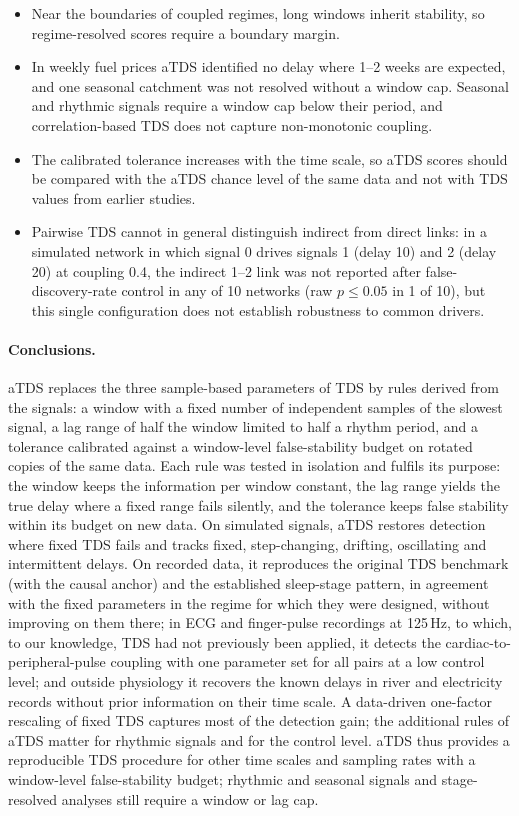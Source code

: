 \documentclass[11pt,a4paper]{article}
\begin{document}
\begin{itemize}
\item Near the boundaries of coupled regimes, long windows inherit stability, so regime-resolved scores require a boundary margin.
\item In weekly fuel prices aTDS identified no delay where 1--2 weeks are expected, and one seasonal catchment was not resolved without a window cap. Seasonal and rhythmic signals require a window cap below their period, and correlation-based TDS does not capture non-monotonic coupling.
\item The calibrated tolerance increases with the time scale, so aTDS scores should be compared with the aTDS chance level of the same data and not with TDS values from earlier studies.
\item Pairwise TDS cannot in general distinguish indirect from direct links: in a simulated network in which signal 0 drives signals 1 (delay 10) and 2 (delay 20) at coupling 0.4, the indirect 1--2 link was not reported after false-discovery-rate control in any of 10 networks (raw $p \le 0.05$ in 1 of 10), but this single configuration does not establish robustness to common drivers.
\end{itemize}

\paragraph{Conclusions.} aTDS replaces the three sample-based parameters of TDS by rules derived from the signals: a window with a fixed number of independent samples of the slowest signal, a lag range of half the window limited to half a rhythm period, and a tolerance calibrated against a window-level false-stability budget on rotated copies of the same data. Each rule was tested in isolation and fulfils its purpose: the window keeps the information per window constant, the lag range yields the true delay where a fixed range fails silently, and the tolerance keeps false stability within its budget on new data. On simulated signals, aTDS restores detection where fixed TDS fails and tracks fixed, step-changing, drifting, oscillating and intermittent delays. On recorded data, it reproduces the original TDS benchmark (with the causal anchor) and the established sleep-stage pattern, in agreement with the fixed parameters in the regime for which they were designed, without improving on them there; in ECG and finger-pulse recordings at 125\,Hz, to which, to our knowledge, TDS had not previously been applied, it detects the cardiac-to-peripheral-pulse coupling with one parameter set for all pairs at a low control level; and outside physiology it recovers the known delays in river and electricity records without prior information on their time scale. A data-driven one-factor rescaling of fixed TDS captures most of the detection gain; the additional rules of aTDS matter for rhythmic signals and for the control level. aTDS thus provides a reproducible TDS procedure for other time scales and sampling rates with a window-level false-stability budget; rhythmic and seasonal signals and stage-resolved analyses still require a window or lag cap.
\end{document}
